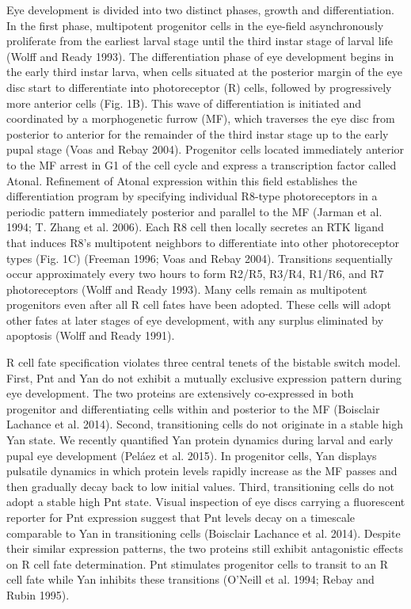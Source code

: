 Eye development is divided into two distinct phases, growth and differentiation. In the first phase, multipotent progenitor cells in the eye-field asynchronously proliferate from the earliest larval stage until the third instar stage of larval life (Wolff and Ready 1993). The differentiation phase of eye development begins in the early third instar larva, when cells situated at the posterior margin of the eye disc start to differentiate into photoreceptor (R) cells, followed by progressively more anterior cells (Fig. 1B). This wave of differentiation is initiated and coordinated by a morphogenetic furrow (MF), which traverses the eye disc from posterior to anterior for the remainder of the third instar stage up to the early pupal stage (Voas and Rebay 2004). Progenitor cells located immediately anterior to the MF arrest in G1 of the cell cycle and express a transcription factor called Atonal. Refinement of Atonal expression within this field establishes the differentiation program by specifying individual R8-type photoreceptors in a periodic pattern immediately posterior and parallel to the MF (Jarman et al. 1994; T. Zhang et al. 2006). Each R8 cell then locally secretes an RTK ligand that induces R8's multipotent neighbors to differentiate into other photoreceptor types (Fig. 1C) (Freeman 1996; Voas and Rebay 2004). Transitions sequentially occur approximately every two hours to form R2/R5, R3/R4, R1/R6, and R7 photoreceptors (Wolff and Ready 1993). Many cells remain as multipotent progenitors even after all R cell fates have been adopted. These cells will adopt other fates at later stages of eye development, with any surplus eliminated by apoptosis (Wolff and Ready 1991).

R cell fate specification violates three central tenets of the bistable switch model. First, Pnt and Yan do not exhibit a mutually exclusive expression pattern during eye development. The two proteins are extensively co-expressed in both progenitor and differentiating cells within and posterior to the MF (Boisclair Lachance et al. 2014). Second, transitioning cells do not originate in a stable high Yan state. We recently quantified Yan protein dynamics during larval and early pupal eye development (Peláez et al. 2015). In progenitor cells, Yan displays pulsatile dynamics in which protein levels rapidly increase as the MF passes and then gradually decay back to low initial values. Third, transitioning cells do not adopt a stable high Pnt state. Visual inspection of eye discs carrying a fluorescent reporter for Pnt expression suggest that Pnt levels decay on a timescale comparable to Yan in transitioning cells (Boisclair Lachance et al. 2014). Despite their similar expression patterns, the two proteins still exhibit antagonistic effects on R cell fate determination. Pnt stimulates progenitor cells to transit to an R cell fate while Yan inhibits these transitions (O'Neill et al. 1994; Rebay and Rubin 1995).

